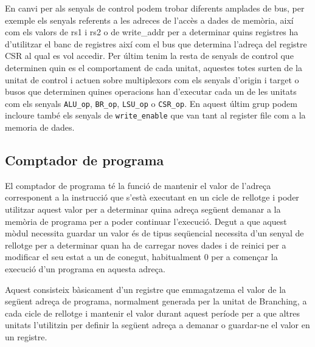 \documentclass[10pt,a4paper,twocolumn,twoside]{article}
\begin{document}
        En canvi per als senyals de control podem trobar diferents amplades de bus, per exemple els senyals referents a les adreces de l'accès a dades de memòria, així com els valors de rs1 i rs2 o de write\_addr per a determinar quins registres ha d'utilitzar el banc de registres així com el bus que determina l'adreça del registre CSR al qual es vol accedir. Per últim tenim la resta de senyals de control que determinen quin es el comportament de cada unitat, aquestes totes surten de la unitat de control i actuen sobre multiplexors com els senyals d'origin i target o busos que determinen quines operacions han d'executar cada un de les unitats com els senyals \verb|ALU_op|, \verb|BR_op|, \verb|LSU_op| o \verb|CSR_op|. En aquest últim grup podem incloure també els senyals de \verb|write_enable| que van tant al register file com a la memoria de dades.
        
        
        
        

        
        
        
        
        
    \subsection{Comptador de programa}
    
    El comptador de programa té la funció de mantenir el valor de l'adreça corresponent a la instrucció que s'està executant en un cicle de rellotge i poder utilitzar aquest valor per a determinar quina adreça següent demanar a la memòria de programa per a poder continuar l'execució.
    Degut a que aquest mòdul necessita guardar un valor és de tipus seqüencial necessita d'un senyal de rellotge per a determinar quan ha de carregar noves dades i de reinici  per a modificar el seu estat a un de conegut, habitualment 0 per a començar la execució d'un programa en aquesta adreça. 
    
    Aquest consisteix bàsicament d'un registre que emmagatzema el valor de la següent adreça de programa, normalment generada per la unitat de Branching, a cada cicle de rellotge i mantenir el valor durant aquest període per a que altres unitats l'utilitzin per definir la següent adreça a demanar o guardar-ne el valor en un registre.
    
\end{document}
